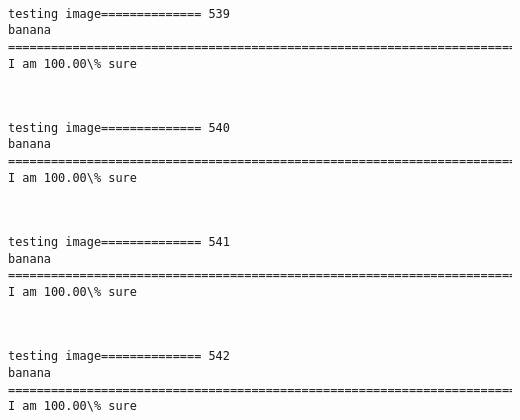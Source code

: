 \documentclass[11pt]{article}
\begin{document}
    \begin{center}
    \end{center}
    { \hspace*{\fill} \\}
    
    \begin{Verbatim}[commandchars=\\\{\}]
testing image============== 539
banana
============================================================================
I am 100.00\% sure

    \end{Verbatim}

    \begin{center}
    \end{center}
    { \hspace*{\fill} \\}
    
    \begin{Verbatim}[commandchars=\\\{\}]
testing image============== 540
banana
============================================================================
I am 100.00\% sure

    \end{Verbatim}

    \begin{center}
    \end{center}
    { \hspace*{\fill} \\}
    
    \begin{Verbatim}[commandchars=\\\{\}]
testing image============== 541
banana
============================================================================
I am 100.00\% sure

    \end{Verbatim}

    \begin{center}
    \end{center}
    { \hspace*{\fill} \\}
    
    \begin{Verbatim}[commandchars=\\\{\}]
testing image============== 542
banana
============================================================================
I am 100.00\% sure

    \end{Verbatim}
\end{document}
